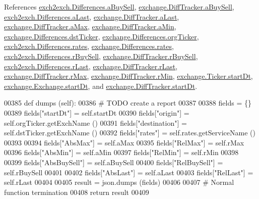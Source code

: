 References \hyperlink{exch2exch_8py_source_l00121}{exch2exch.\+Differences.\+a\+Buy\+Sell}, \hyperlink{exchange_8py_source_l00301}{exchange.\+Diff\+Tracker.\+a\+Buy\+Sell}, \hyperlink{exch2exch_8py_source_l00124}{exch2exch.\+Differences.\+a\+Last}, \hyperlink{exchange_8py_source_l00304}{exchange.\+Diff\+Tracker.\+a\+Last}, \hyperlink{exchange_8py_source_l00295}{exchange.\+Diff\+Tracker.\+a\+Max}, \hyperlink{exchange_8py_source_l00296}{exchange.\+Diff\+Tracker.\+a\+Min}, \hyperlink{exchange_8py_source_l00265}{exchange.\+Differences.\+dst\+Ticker}, \hyperlink{exchange_8py_source_l00266}{exchange.\+Differences.\+org\+Ticker}, \hyperlink{exch2exch_8py_source_l00107}{exch2exch.\+Differences.\+rates}, \hyperlink{exchange_8py_source_l00264}{exchange.\+Differences.\+rates}, \hyperlink{exch2exch_8py_source_l00122}{exch2exch.\+Differences.\+r\+Buy\+Sell}, \hyperlink{exchange_8py_source_l00302}{exchange.\+Diff\+Tracker.\+r\+Buy\+Sell}, \hyperlink{exch2exch_8py_source_l00125}{exch2exch.\+Differences.\+r\+Last}, \hyperlink{exchange_8py_source_l00305}{exchange.\+Diff\+Tracker.\+r\+Last}, \hyperlink{exchange_8py_source_l00299}{exchange.\+Diff\+Tracker.\+r\+Max}, \hyperlink{exchange_8py_source_l00298}{exchange.\+Diff\+Tracker.\+r\+Min}, \hyperlink{exchange_8py_source_l00067}{exchange.\+Ticker.\+start\+Dt}, \hyperlink{exchange_8py_source_l00177}{exchange.\+Exchange.\+start\+Dt}, and \hyperlink{exchange_8py_source_l00307}{exchange.\+Diff\+Tracker.\+start\+Dt}.


\begin{DoxyCode}
00385     \textcolor{keyword}{def }dumps (self):
00386         \textcolor{comment}{# TODO create a report }
00387     
00388         fields = \{\}
00389         fields[\textcolor{stringliteral}{"startDt"}]     = self.startDt
00390         fields[\textcolor{stringliteral}{"origin"}]      = self.orgTicker.getExchName ()
00391         fields[\textcolor{stringliteral}{"destination"}] = self.dstTicker.getExchName ()
00392         fields[\textcolor{stringliteral}{"rates"}]       = self.rates.getServiceName ()
00393         
00394         fields[\textcolor{stringliteral}{"AbsMax"}] = self.aMax
00395         fields[\textcolor{stringliteral}{"RelMax"}] = self.rMax
00396         fields[\textcolor{stringliteral}{"AbsMin"}] = self.aMin
00397         fields[\textcolor{stringliteral}{"RelMin"}] = self.rMin
00398         
00399         fields[\textcolor{stringliteral}{"AbsBuySell"}] = self.aBuySell
00400         fields[\textcolor{stringliteral}{"RelBuySell"}] = self.rBuySell
00401         
00402         fields[\textcolor{stringliteral}{"AbsLast"}] = self.aLast
00403         fields[\textcolor{stringliteral}{"RelLast"}] = self.rLast
00404        
00405         result = json.dumps (fields)
00406          
00407         \textcolor{comment}{# Normal function termination}
00408         \textcolor{keywordflow}{return} result
00409         
\end{DoxyCode}


